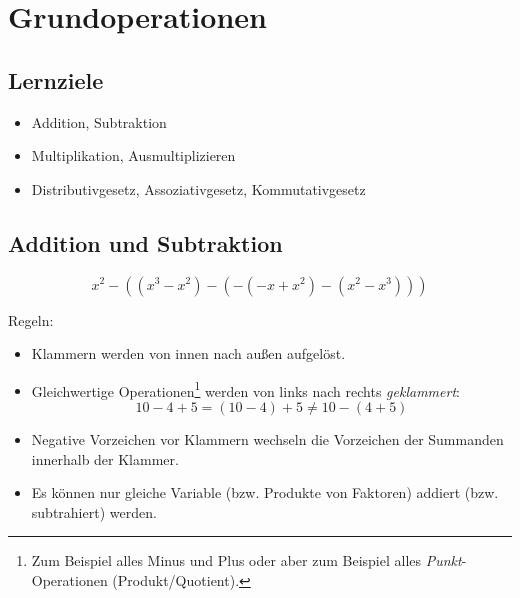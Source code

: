 \newpage
\section{Grundoperationen}
\renewcommand{\bbwAufgabenBlockID}{A1G}

\subsection*{Lernziele}
\begin{itemize}
\item Addition, Subtraktion
\item Multiplikation, Ausmultiplizieren
\item Distributivgesetz,
  Assoziativgesetz,
  Kommutativgesetz
\end{itemize}

\newpage

\subsection{Addition und Subtraktion}
\begin{beispiel}{}{}
  $$x^2-((x^3-x^2)-(-(-x+x^2)-(x^2-x^3)))$$
\end{beispiel}


Regeln:
\begin{itemize}
\item Klammern werden von innen nach außen aufgelöst.
\item Gleichwertige Operationen\footnote{Zum Beispiel alles Minus und Plus oder aber zum Beispiel alles \textit{Punkt}-Operationen (Produkt/Quotient).} werden von links nach rechts \textit{geklammert}:
  $$10-4+5 = (10-4) + 5 \ne 10-(4+5)$$
\item Negative Vorzeichen vor Klammern wechseln die Vorzeichen der
      Summanden innerhalb der Klammer.
\item Es können nur gleiche Variable (bzw. Produkte von Faktoren)
      addiert (bzw. subtrahiert) werden.
\end{itemize}

